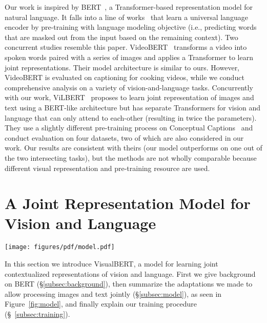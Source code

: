 \documentclass{article} \usepackage{iclr2019_conference,times}
\newcommand{\model}{VisualBERT\xspace}
\begin{document}
Our work is inspired by BERT~\citep{devlin2018bert}, a Transformer-based representation model for natural language.
It falls into a line of works~\citep{peters2018deep,radford2018improving,radford2019language} that learn a universal language encoder by pre-training with language modeling objective (i.e., predicting words that are masked out from the input based on the remaining context).
Two concurrent studies resemble this paper. VideoBERT~\citep{sun2019videobert} transforms a video into spoken words paired with a series of images and applies a Transformer to learn joint representations.
Their model architecture is similar to ours.
However, VideoBERT is evaluated on captioning for cooking videos, while we conduct comprehensive analysis on a variety of vision-and-language tasks. 
Concurrently with our work, ViLBERT~\citep{lu2019vilbert} proposes to learn joint representation of images and text using a BERT-like architecture but has separate Transformers for vision and language that can only attend to each-other (resulting in twice the parameters). They use a slightly different pre-training process on Conceptual Captions~\citep{sharma2018conceptual} and conduct evaluation on four datasets, two of which are also considered in our work. Our results are consistent with theirs (our model outperforms on one out of the two intersecting tasks), but the methods are not wholly comparable because different visual representation and pre-training resource are used. 


\section{A Joint Representation Model for Vision and Language}\label{approach}

\begin{figure*} [t]
\centering
\texttt{[image: figures/pdf/model.pdf]}
\caption{The architecture of VisualBERT. Image regions and language are combined with a Transformer to allow the self-attention to discover implicit alignments between language and vision. It is pre-trained with a masked language modeling (Objective 1), and sentence-image prediction task (Objective 2), on caption data and then fine-tuned for different tasks. See \S \ref{training_process} for more details.
}
\label{fig:model}
\end{figure*}
In this section we introduce \model, a model for learning joint contextualized representations of vision and language.
First we give background on BERT (\S \ref{subsec:background}), then summarize the adaptations we made to allow processing images and text jointly (\S \ref{subsec:model}), as seen in Figure~\ref{fig:model}, and finally explain our training procedure (\S ~\ref{subsec:training}).
\end{document}
